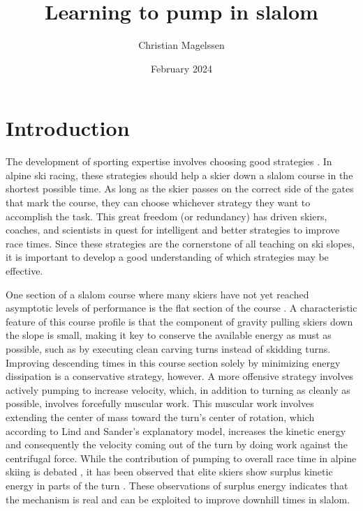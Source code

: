 \documentclass{article}
\title{Learning to pump in slalom}
\author{Christian Magelssen}
\date{February 2024}
\begin{document}
\section{Introduction}
The development of sporting expertise involves choosing good strategies \cite{krakauer_motor_2019, taylor_role_2012, gray_plateaus_2017, taylor_cerebellar_2014}. In alpine ski racing, these strategies should help a skier down a slalom course in the shortest possible time. As long as the skier passes on the correct side of the gates that mark the course, they can choose whichever strategy they want to accomplish the task. This great freedom (or redundancy) has driven skiers, coaches, and scientists in quest for intelligent and better strategies to improve race times\cite{lemaster_skiers_1999, lemaster_ultimate_2010, reid_kinematic_2010, joubert_how_1967, joubert_ski_1978, luginbuhl_identification_2023, lind_physics_2013}. Since these strategies are the cornerstone of all teaching on ski slopes, it is important to develop a good understanding of which strategies may be effective.

One section of a slalom course where many skiers have not yet reached asymptotic levels of performance is the flat section of the course \cite{supej_new_2011, magelssen_is_2022}. A characteristic feature of this course profile is that the component of gravity pulling skiers down the slope is small, making it key to conserve the available energy as must as possible, such as by executing clean carving turns instead of skidding turns\cite{supej_how_2010}. Improving descending times in this course section solely by minimizing energy dissipation is a conservative strategy, however. A more offensive strategy involves actively pumping to increase velocity\cite{lind_physics_2013}, which, in addition to turning as cleanly as possible, involves forcefully muscular work. This muscular work involves extending the center of mass toward the turn's center of rotation, which according to Lind and Sander's\cite{lind_physics_2013} explanatory model, increases the kinetic energy and consequently the velocity coming out of the turn by doing work against the centrifugal force. While the contribution of pumping to overall race time in alpine skiing is debated \cite{supej_differential_2008}, it has been observed that elite skiers show surplus kinetic energy in parts of the turn \cite{reid_kinematic_2010, supej_differential_2008, supej_how_2010}. These observations of surplus energy indicates that the mechanism is real and can be exploited to improve downhill times in slalom.
\end{document}
